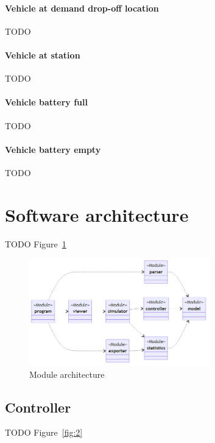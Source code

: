 \documentclass{article}
\begin{document}
    \paragraph{Vehicle at demand drop-off location}
    TODO

    \paragraph{Vehicle at station}
    TODO

    \paragraph{Vehicle battery full}
    TODO

    \paragraph{Vehicle battery empty}
    TODO

    \section{Software architecture}
    \label{sec:arch}
    TODO Figure~\ref{fig:0}

    \begin{figure}[htbp]
        \centering
        \includegraphics[width=0.7\textwidth]{../../diagrams/architecture.png}
        \caption{Module architecture}
        \label{fig:0}
    \end{figure}

    \subsection{Controller}
    \label{sec:controller}
    TODO Figure~\ref{fig:2}
\end{document}
